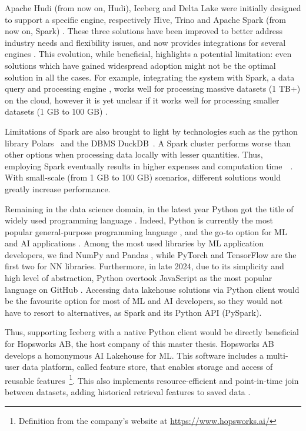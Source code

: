 Apache Hudi (from now on, Hudi), Iceberg and Delta Lake were initially designed to support a specific engine, respectively Hive, Trino and Apache Spark (from now on, Spark) \cite{ApacheHudiVs}. These three solutions have been improved to better address industry needs and flexibility issues, and now provides integrations for several engines \cite{OngoingEvolutionTableFormat}. This evolution, while beneficial, highlights a potential limitation: even solutions which have gained widespread adoption might not be the optimal solution in all the cases. For example, integrating the system with Spark, a data query and processing engine \cite{zahariaApacheSparkUnified2016}, works well for processing massive datasets (1 TB+) on the cloud, however it is yet unclear if it works well for processing smaller datasets (1 GB to 100 GB) \cite{Khazanchi1801362}. 

Limitations of Spark are also brought to light by technologies such as the python library Polars~\cite{vinkWroteOneFastest2021} and the \gls{DBMS} DuckDB~\cite{raasveldtDuckDBEmbeddableAnalytical2019}. A Spark cluster performs worse than other options when processing data locally with lesser quantities. Thus, employing Spark eventually results in higher expenses and computation time~\cite{ebergenUpdatesH2OAi2023}~\cite{BenchmarkResultsSpark}. With small-scale (from 1 GB to 100 GB) scenarios, different solutions would greatly increase performance.

Remaining in the data science domain, in the latest year Python got the title of widely used programming language \cite{nagpalPythonDataAnalytics2019}. Indeed, Python is currently the most popular general-purpose programming language \cite{TIOBEIndex, StackOverflowDeveloper}, and the go-to option for \gls{ML} and \gls{AI} applications \cite{python-machine-learning}. Among the most used libraries by \gls{ML} application developers, we find NumPy and Pandas \cite{StackOverflowDeveloper}, while PyTorch and TensorFlow are the first two for \gls{NN} libraries. Furthermore, in late 2024, due to its simplicity and high level of abstraction, Python overtook JavaScript as the most popular language on GitHub \cite{PythonTopLanguage}. Accessing data lakehouse solutions via Python client would be the favourite option for most of \gls{ML} and \gls{AI} developers, so they would not have to resort to alternatives, as Spark and its Python \gls{API} (PySpark). 

Thus, supporting Iceberg with a native Python client would be directly beneficial for Hopsworks \gls{AB}, the host company of this master thesis. Hopsworks \gls{AB} develops a homonymous \gls{AI} Lakehouse for \gls{ML}. This software includes a multi-user data platform, called feature store, that enables storage and access of reusable features~\footnote{Definition from the company's website at \url{https://www.hopsworks.ai/}}. This also implements resource-efficient and point-in-time join between datasets, adding historical retrieval features to saved data \cite{Pettersson1695672}.


